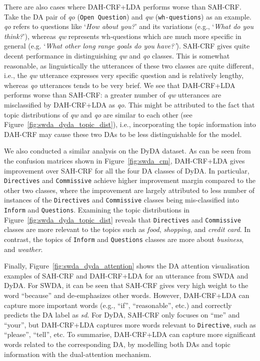\documentclass[11pt,a4paper]{article}
\begin{document}
There are also cases where DAH-CRF+LDA performs worse than SAH-CRF. Take the DA pair of \textit{qo} (\texttt{Open Question}) and \textit{qw} (\texttt{wh-questions}) as an example. \textit{qo} refers to questions like `\textit{How about you?}' and its variations (e.g., `\textit{What do you think?}'), whereas \textit{qw} represents  wh-questions which are much more specific in general  (e.g. `\textit{What other long range goals do you have?'}). 
SAH-CRF gives quite decent performance in distinguishing \textit{qw} and \textit{qo} classes. This is somewhat reasonable,  as linguistically the utterances of these two classes are quite different, i.e., the \textit{qw} utterance expresses very specific question and is relatively lengthy, whereas \textit{qo} utterances tends to be very brief. We see that DAH-CRF+LDA  performs worse than SAH-CRF: a greater number of \textit{qw} utterances are misclassified by DAH-CRF+LDA as \textit{qo}. This might be attributed to the fact that topic distributions of \textit{qw} and \textit{qo} are similar to each other (see  Figure~\ref{fig:swda_dyda_topic_dist}), i.e., incorporating the topic information into DAH-CRF may cause these two DAs to be less distinguishable for the model. 



We also conducted a similar analysis on the DyDA dataset. As can be seen from the confusion matrices shown in Figure~\ref{fig:swda_cm}, DAH-CRF+LDA gives improvement over SAH-CRF for all the four DA classes of DyDA. In particular, \texttt{Directives} and \texttt{Commissive} achieve higher improvement margin compared to the other two classes, where the improvement are largely attributed to less number of instances of the \texttt{Directives} and \texttt{Commissive} classes being mis-classified into \texttt{Inform} and \texttt{Questions}. 
Examining the topic distributions in Figure~\ref{fig:swda_dyda_topic_dist}
reveals that  \texttt{Directives} and \texttt{Commissive} classes are more relevant to the topics such as \textit{food}, \textit{shopping}, and \textit{credit card}. In contrast, the topics of \texttt{Inform} and \texttt{Questions} classes are more about \textit{business}, and \textit{weather}.  





Finally, Figure~\ref{fig:swda_dyda_attention} shows the DA attention visualisation examples of SAH-CRF and DAH-CRF+LDA for an utterance from SWDA and DyDA. For SWDA, it can be seen that SAH-CRF gives very high weight to  the word ``because'' and de-emphasizes other words. However, DAH-CRF+LDA can capture more important words (e.g.,  ``if'', ``reasonable'', etc.) and correctly predicts the DA label as \textit{sd}. For DyDA, SAH-CRF only focuses on ``me'' and ``your'', but DAH-CRF+LDA captures more words relevant to \texttt{Directive}, such as ``please'', ``tell'', etc. To summarise, DAH-CRF+LDA can capture  more significant words related to the corresponding DA, by modelling both DAs and topic information with the dual-attention mechanism.
\end{document}
